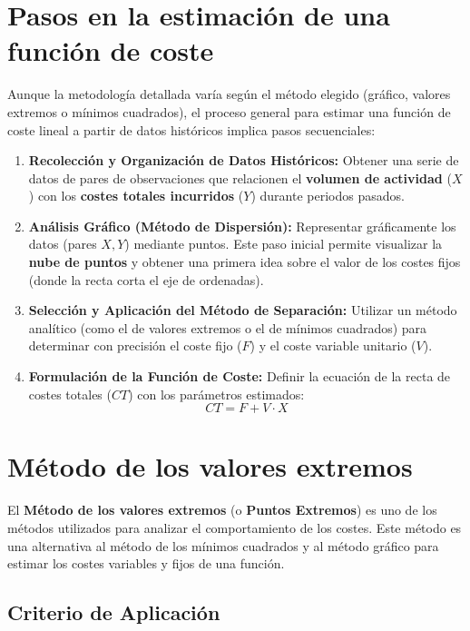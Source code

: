 \section{Pasos en la estimación de una función de coste}

Aunque la metodología detallada varía según el método elegido (gráfico, valores extremos o mínimos cuadrados), el proceso general para estimar una función de coste lineal a partir de datos históricos implica pasos secuenciales:

\begin{enumerate}
    \item \textbf{Recolección y Organización de Datos Históricos:} Obtener una serie de datos de pares de observaciones que relacionen el \textbf{volumen de actividad} ($X$) con los \textbf{costes totales incurridos} ($Y$) durante periodos pasados.
    \item \textbf{Análisis Gráfico (Método de Dispersión):} Representar gráficamente los datos (pares $X, Y$) mediante puntos. Este paso inicial permite visualizar la \textbf{nube de puntos} y obtener una primera idea sobre el valor de los costes fijos (donde la recta corta el eje de ordenadas).
    \item \textbf{Selección y Aplicación del Método de Separación:} Utilizar un método analítico (como el de valores extremos o el de mínimos cuadrados) para determinar con precisión el coste fijo ($F$) y el coste variable unitario ($V$).
    \item \textbf{Formulación de la Función de Coste:} Definir la ecuación de la recta de costes totales ($CT$) con los parámetros estimados:
    $$CT = F + V \cdot X$$
\end{enumerate}

\section{Método de los valores extremos}

El \textbf{Método de los valores extremos} (o \textbf{Puntos Extremos}) es uno de los métodos utilizados para analizar el comportamiento de los costes. Este método es una alternativa al método de los mínimos cuadrados y al método gráfico para estimar los costes variables y fijos de una función.

\subsection{Criterio de Aplicación}

